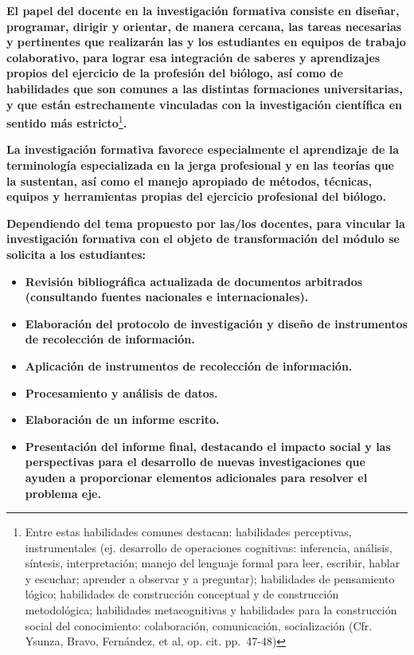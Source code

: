 \documentclass[
]{article}
\begin{document}
\textbf{El papel del docente en la investigación formativa consiste en
diseñar, programar, dirigir y orientar, de manera cercana, las tareas
necesarias y pertinentes que realizarán las y los estudiantes en equipos
de trabajo colaborativo, para lograr esa integración de saberes y
aprendizajes propios del ejercicio de la profesión del biólogo, así como
de habilidades que son comunes a las distintas formaciones
universitarias, y que están estrechamente vinculadas con la
investigación científica en sentido más estricto}\footnote{Entre estas
  habilidades comunes destacan: habilidades perceptivas, instrumentales
  (ej. desarrollo de operaciones cognitivas: inferencia, análisis,
  síntesis, interpretación; manejo del lenguaje formal para leer,
  escribir, hablar y escuchar; aprender a observar y a preguntar);
  habilidades de pensamiento lógico; habilidades de construcción
  conceptual y de construcción metodológica; habilidades metacognitivas
  y habilidades para la construcción social del conocimiento:
  colaboración, comunicación, socialización (Cfr. Ysunza, Bravo,
  Fernández, et al, op. cit. pp.~47-48)}\textbf{.}

\textbf{La investigación formativa favorece especialmente el aprendizaje
de la terminología especializada en la jerga profesional y en las
teorías que la sustentan, así como el manejo apropiado de métodos,
técnicas, equipos y herramientas propias del ejercicio profesional del
biólogo.}

\textbf{Dependiendo del tema propuesto por las/los docentes, para
vincular la investigación formativa con el objeto de transformación del
módulo se solicita a los estudiantes:}

\begin{itemize}
\item
  \textbf{Revisión bibliográfica actualizada de documentos arbitrados
  (consultando fuentes nacionales e internacionales).}
\item
  \textbf{Elaboración del protocolo de investigación y diseño de
  instrumentos de recolección de información.}
\item
  \textbf{Aplicación de instrumentos de recolección de información.}
\item
  \textbf{Procesamiento y análisis de datos.}
\item
  \textbf{Elaboración de un informe escrito.}
\item
  \textbf{Presentación del informe final, destacando el impacto social y
  las perspectivas para el desarrollo de nuevas investigaciones que
  ayuden a proporcionar elementos adicionales para resolver el problema
  eje.}
\end{itemize}
\end{document}
